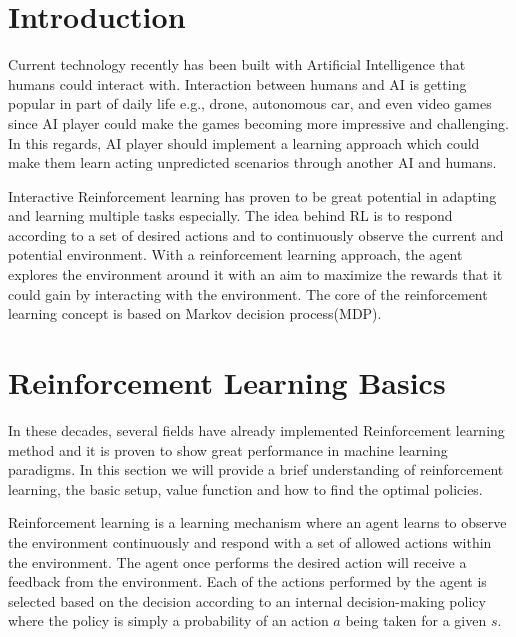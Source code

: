 \documentclass[12pt,twoside]{article}
\theoremstyle{plain}
\theoremstyle{definition}
\theoremstyle{remark}
\begin{document}
\setcounter{tocdepth}{2} 					%
\tableofcontents
{}
\clearpage





\section{Introduction}
\label{sec:introduction}
  
Current technology recently has been built with Artificial Intelligence that humans could interact with. Interaction between humans and AI is getting popular in part of daily life e.g., drone, autonomous car, and even video games since AI player could make the games becoming more impressive and challenging. In this regards, AI player should implement a learning approach which could make them learn acting unpredicted scenarios through another AI and humans.

Interactive Reinforcement learning has proven to be great potential in adapting and learning multiple tasks especially. The idea behind RL is to respond according to a set of desired actions and to continuously observe the current and potential environment. With a reinforcement learning approach, the agent explores the environment
around it with an aim to maximize the rewards that it could gain by interacting
with the environment. The core of the reinforcement learning concept is based on Markov decision process(MDP). 



\section{Reinforcement Learning Basics}

In these decades, several fields have already implemented Reinforcement learning method and it is proven to show great performance in machine learning paradigms. In this section we will provide a brief understanding of reinforcement learning, the basic setup, value function and how to find the optimal policies.

Reinforcement learning is a learning mechanism where an agent learns to observe the environment continuously and respond with a set of allowed actions within the environment. The agent once performs the desired action will receive a feedback from the environment. Each of the actions performed by the agent is selected based on the decision according to an internal decision-making policy where the policy is simply a probability of an action $a$ being taken for a given $s$. 
\end{document}
